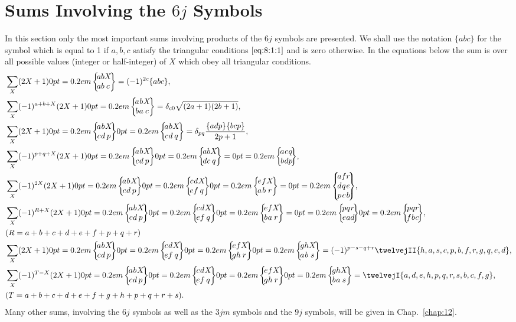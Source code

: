 \section{Sums Involving the $6 j$ Symbols}\label{sec:9.8}
In this section only the most important sums involving products of the $6 j$ symbols are presented. We shall use the notation $\{a b c\}$ for the symbol which is equal to 1 if $a, b, c$ satisfy the triangular conditions $\eqref{eq:8:1:1}$ and is zero otherwise. In the equations below the sum is over all possible values (integer or half-integer) of $X$ which obey all triangular conditions.
\begin{align}
& \sum_{X}(2 X+1)\sixj{a}{b}{X}{a}{b}{c}=(-1)^{2 c}\{a b c\},  \label{eq:9:8:1}\\
& \sum_{X}(-1)^{a+b+X}(2 X+1)\sixj{a}{b}{X}{b}{a}{c}=\delta_{c 0} \sqrt{(2 a+1)(2 b+1)},  \label{eq:9:8:2}\\
& \sum_{X}(2 X+1)\sixj{a}{b}{X}{c}{d}{p}\sixj{a}{b}{X}{c}{d}{q}=\delta_{p q} \frac{\{a d p\}\{b c p\}}{2 p+1},  \label{eq:9:8:3}\\
& \sum_{X}(-1)^{p+q+X}(2 X+1)\sixj{a}{b}{X}{c}{d}{p}\sixj{a}{b}{X}{d}{c}{q}=\sixj{a}{c}{q}{b}{d}{p},  \label{eq:9:8:4}\\
& \sum_{X}(-1)^{2 X}(2 X+1)\sixj{a}{b}{X}{c}{d}{p}\sixj{c}{d}{X}{e}{f}{q}\sixj{e}{f}{X}{a}{b}{r}=\ninej{a}{f}{r}{d}{q}{e}{p}{c}{b},  \label{eq:9:8:5}\\
& \sum_{X}(-1)^{R+X}(2 X+1)\sixj{a}{b}{X}{c}{d}{p}\sixj{c}{d}{X}{e}{f}{q}\sixj{e}{f}{X}{b}{a}{r}=\sixj{p}{q}{r}{e}{a}{d}\sixj{p}{q}{r}{f}{b}{c},  \label{eq:9:8:6}\\
& (R=a+b+c+d+e+f+p+q+r)  \notag\\
& \sum_{X}(2 X+1)\sixj{a}{b}{X}{c}{d}{p}\sixj{c}{d}{X}{e}{f}{q}\sixj{e}{f}{X}{g}{h}{r}\sixj{g}{h}{X}{a}{b}{s}=(-1)^{p-s-q+r}\twelvejII{h,a,s,c,p,b,f,r,g,q,e,d},  \label{eq:9:8:7}\\
& \sum_{X}(-1)^{T-X}(2 X+1)\sixj{a}{b}{X}{c}{d}{p}\sixj{c}{d}{X}{e}{f}{q}\sixj{e}{f}{X}{g}{h}{r}\sixj{g}{h}{X}{b}{a}{s}=\twelvejI{a,d,e,h,p,q,r,s,b,c,f,g},  \notag\\
& (T=a+b+c+d+e+f+g+h+p+q+r+s) . \label{eq:9:8:8}
\end{align}
Many other sums, involving the $6 j$ symbols as well as the $3 j m$ symbols and the $9 j$ symbols, will be given in Chap.~\ref{chap:12}.

